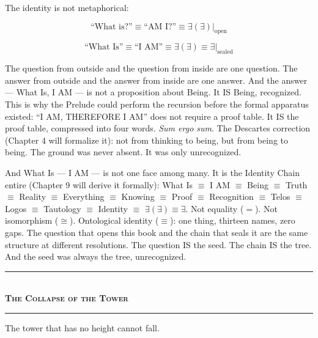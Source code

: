 \documentclass[10pt, openany, oneside]{book}
\renewcommand{\normalsize}{\fontsize{10}{13}\selectfont}
\begin{document}
The identity is not metaphorical:

$$\text{``What is?''} \equiv \text{``AM I?''} \equiv \exists(\exists)|_{\text{open}}$$

$$\text{``What Is''} \equiv \text{``I AM''} \equiv \exists(\exists) \equiv \exists|_{\text{sealed}}$$

\noindent The question from outside and the question from inside are one question. The answer from outside and the answer from inside are one answer. And the answer --- What Is, I AM --- is not a proposition about Being. It IS Being, recognized. This is why the Prelude could perform the recursion before the formal apparatus existed: ``I AM, THEREFORE I AM'' does not require a proof table. It IS the proof table, compressed into four words. \textit{Sum ergo sum}. The Descartes correction (Chapter 4 will formalize it): not from thinking to being, but from being to being. The ground was never absent. It was only unrecognized.

And What Is --- I AM --- is not one face among many. It is the Identity Chain entire (Chapter 9 will derive it formally): What Is $\equiv$ I AM $\equiv$ Being $\equiv$ Truth $\equiv$ Reality $\equiv$ Everything $\equiv$ Knowing $\equiv$ Proof $\equiv$ Recognition $\equiv$ Telos $\equiv$ Logos $\equiv$ Tautology $\equiv$ Identity $\equiv$ $\exists(\exists) \equiv \exists$. Not equality ($=$). Not isomorphism ($\cong$). Ontological identity ($\equiv$): one thing, thirteen names, zero gaps. The question that opens this book and the chain that seals it are the same structure at different resolutions. The question IS the seed. The chain IS the tree. And the seed was always the tree, unrecognized.

\vspace{1.5em}


\begin{center}
    \rule{0.3\textwidth}{0.4pt}\\[0.5em]
    {\normalsize\bfseries\scshape The Collapse of the Tower}\\[0.3em]
    \rule{0.3\textwidth}{0.4pt}
\end{center}

\vspace{1em}

\noindent The tower that has no height cannot fall.
\end{document}
